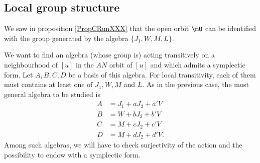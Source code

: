 \subsection{Local group structure}

We saw in proposition \ref{PropCRunXXX} that the open orbit $\mU$ can be identified with the group generated by the algebra $\{ J_{1},W,M,L \}$. 

We want to find an algebra (whose group is) acting transitively on a neighbourhood of $[u]$ in the $AN$ orbit of $[u]$ and which admits a symplectic form. Let $A,B,C,D$ be a basis of this algebra. For local transitivity, each of them must contains at least one of $J_{1},W,M$ and $L$. As in the previous case, the most general algebra to be studied is
\begin{subequations}   \label{EqAlgGEnennsy}
\begin{align}
 A&=J_{1}+aJ_{2}+a'V\\
 B&=W+bJ_{2}+b'V\\
 C&=M+cJ_{2}+c'V\\
 D&=M+dJ_{2}+d'V.
\end{align}
\end{subequations}
Among such algebras, we will have to check surjectivity of the action and the possibility to endow with a symplectic form.

